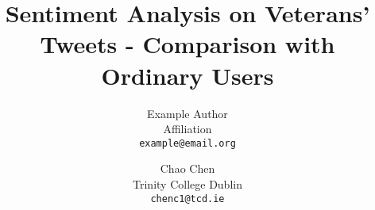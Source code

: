 \documentclass[a4paper,11pt]{article}
\title{Sentiment Analysis on Veterans' Tweets - Comparison with Ordinary Users}
\date{}
\author{
  Example Author\\
  Affiliation\\
  \texttt{example@email.org}
  \and Chao Chen\\
  Trinity College Dublin\\
  \texttt{chenc1@tcd.ie}
}
\begin{document}
\maketitle
\thispagestyle{empty}
\pagestyle{empty}

\begin{abstract}

\end{abstract}










\end{document}

